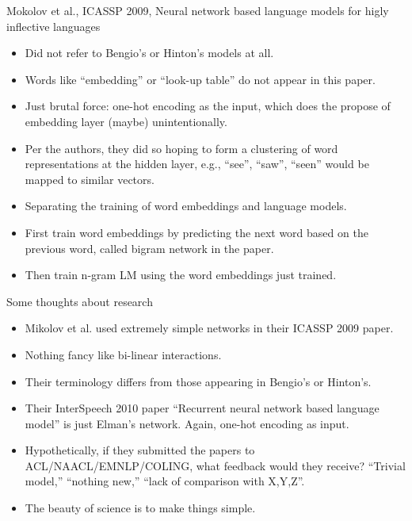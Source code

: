 \documentclass[11pt,handout]{beamer}
\begin{document}
\begin{frame}{Mokolov et al., ICASSP 2009, Neural network based language models for higly inflective languages}
\begin{itemize}[<+->]
   \item Did not refer to Bengio's or Hinton's models at all. 
   \item Words like ``embedding'' or ``look-up table'' do not appear in this paper. 
   \item Just brutal force: one-hot encoding as the input, which does the propose of embedding layer (maybe) unintentionally. 
   \item Per the authors, they did so hoping to form a clustering of word representations at the hidden layer, e.g., ``see'', ``saw'', ``seen'' would be mapped to similar vectors. 
   \item Separating the training of word embeddings and language models. 
   \item First train word embeddings by predicting the next word based on the previous word, called bigram network in the paper. 
   \item Then train n-gram LM using the word embeddings just trained. 
\end{itemize}
\end{frame}

\begin{frame}{Some thoughts about research}
\begin{itemize}[<+->]
   \item Mikolov et al. used extremely simple networks in their ICASSP 2009 paper. 
   \item Nothing fancy like bi-linear interactions. 
   \item Their terminology differs from those appearing in Bengio's or Hinton's. 
   \item Their InterSpeech 2010 paper ``Recurrent neural network based language model'' is just Elman's network. Again, one-hot encoding as input. 
   \item Hypothetically, if they submitted the papers to ACL/NAACL/EMNLP/COLING, what feedback would they receive? ``Trivial model,'' ``nothing new,'' ``lack of comparison with X,Y,Z''. 
   \item The beauty of science is to make things simple.
\end{itemize}
\end{frame}
\end{document}
